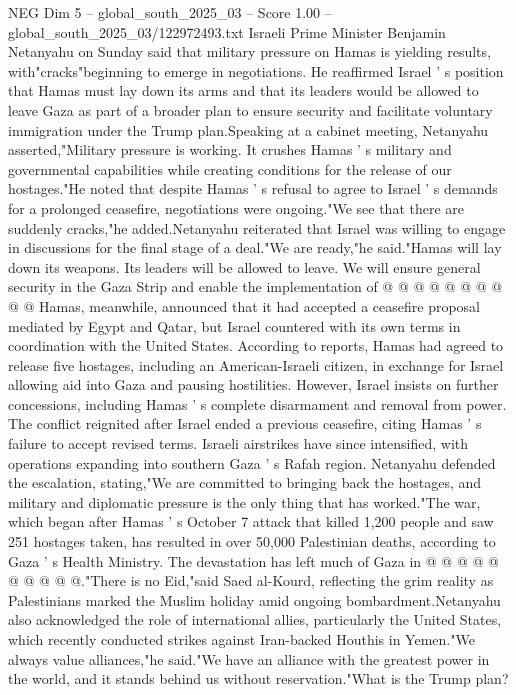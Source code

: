 \begin{textsample}{NEG Dim 5 – global\_south\_2025\_03 – Score 1.00 – global\_south\_2025\_03/122972493.txt}  \label{ex:f5_neg_279}
Israeli Prime Minister Benjamin Netanyahu on Sunday said that military pressure on Hamas is yielding results, with"cracks"beginning to emerge in negotiations.
He reaffirmed Israel ' s position that Hamas must lay down its arms and that its leaders would be allowed to leave Gaza as part of a broader plan to ensure security and facilitate voluntary immigration under the Trump plan.Speaking at a cabinet meeting, Netanyahu asserted,"Military pressure is working.
It crushes Hamas ' s military and governmental capabilities while creating conditions for the release of our hostages."He noted that despite Hamas ' s refusal to agree to Israel ' s demands for a prolonged ceasefire, negotiations were ongoing."We see that there are suddenly cracks,"he added.Netanyahu reiterated that Israel was willing to engage in discussions for the final stage of a deal."We are ready,"he said."Hamas will lay down its weapons.
Its leaders will be allowed to leave.
We will ensure general security in the Gaza Strip and enable the implementation of @ @ @ @ @ @ @ @ @ @ Hamas, meanwhile, announced that it had accepted a ceasefire proposal mediated by Egypt and Qatar, but Israel countered with its own terms in coordination with the United States.
According to reports, Hamas had agreed to release five hostages, including an American-Israeli citizen, in exchange for Israel allowing aid into Gaza and pausing hostilities.
However, Israel insists on further concessions, including Hamas ' s complete disarmament and removal from power.
The conflict reignited after Israel ended a previous ceasefire, citing Hamas ' s failure to accept revised terms.
Israeli airstrikes have since intensified, with operations expanding into southern Gaza ' s Rafah region.
Netanyahu defended the escalation, stating,"We are committed to bringing back the hostages, and military and diplomatic pressure is the only thing that has worked."The war, which began after Hamas ' s October 7 attack that killed 1,200 people and saw 251 hostages taken, has resulted in over 50,000 Palestinian deaths, according to Gaza ' s Health Ministry.
The devastation has left much of Gaza in @ @ @ @ @ @ @ @ @ @."There is no Eid,"said Saed al-Kourd, reflecting the grim reality as Palestinians marked the Muslim holiday amid ongoing bombardment.Netanyahu also acknowledged the role of international allies, particularly the United States, which recently conducted strikes against Iran-backed Houthis in Yemen."We always value alliances,"he said."We have an alliance with the greatest power in the world, and it stands behind us without reservation."What is the Trump plan?

\end{textsample}

